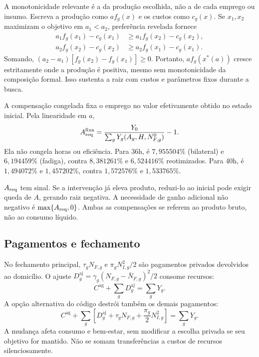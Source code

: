 A monotonicidade relevante é a da produção escolhida, não a de cada emprego ou insumo. Escreva a produção como $af_g(x)$ e os custos como $c_g(x)$. Se $x_1,x_2$ maximizam o objetivo em $a_1<a_2$, preferência revelada fornece
\begin{align*}
a_1f_g(x_1)-c_g(x_1)&\geq a_1f_g(x_2)-c_g(x_2),\\
a_2f_g(x_2)-c_g(x_2)&\geq a_2f_g(x_1)-c_g(x_1).
\end{align*}
Somando, $(a_2-a_1)[f_g(x_2)-f_g(x_1)]\geq0$. Portanto, $af_g(x^*(a))$ cresce estritamente onde a produção é positiva, mesmo sem monotonicidade da composição formal. Isso sustenta a raiz com custos e parâmetros fixos durante a busca.

A compensação congelada fixa o emprego no valor efetivamente obtido no estado inicial. Pela linearidade em $a$,
\begin{equation}\label{eq:app_areq_frozen}
A_{\mathrm{req}}^{\mathrm{fixa}}=\frac{Y_0}{\sum_gY_g(A_g,H,N_{F,g}^0)}-1.
\end{equation}
\begingroup{}
Ela não congela horas ou eficiência. Para 36h, é $7{,}955504\%$ (bilateral) e $6{,}194459\%$ (fadiga), contra $8{,}381261\%$ e $6{,}524416\%$ reotimizados. Para 40h, é $1{,}494072\%$ e $1{,}457202\%$, contra $1{,}572576\%$ e $1{,}533765\%$.
\par\endgroup

$A_{\mathrm{req}}$ tem sinal. Se a intervenção já eleva produto, reduzi-lo ao inicial pode exigir queda de $A$, gerando raiz negativa. A necessidade de ganho adicional não negativo é $\max\{A_{\mathrm{req}},0\}$. Ambas as compensações se referem ao produto bruto, não ao consumo líquido.

\subsection{Pagamentos e fechamento}\label{app:pe_omits}
No fechamento principal, $\tau_gN_{F,g}$ e $\pi_gN_{I,g}^2/2$ são pagamentos privados devolvidos ao domicílio. O ajuste $D_g^{\mathrm{aj}}=\gamma_g(N_{F,g}-\bar N_{F,g})^2/2$ consome recursos:
\begin{equation}\label{eq:app_resources}
C^{\mathrm{ag}}+\sum_gD_g^{\mathrm{aj}}=\sum_gY_g.
\end{equation}
A opção alternativa do código destrói também os demais pagamentos:
\begin{equation}\label{eq:app_resources_alternative}
C^{\mathrm{ag}}+\sum_g\left[D_g^{\mathrm{aj}}+\tau_gN_{F,g}+\frac{\pi_g}{2}N_{I,g}^2\right]=\sum_gY_g.
\end{equation}
A mudança afeta consumo e bem-estar, sem modificar a escolha privada se seu objetivo for mantido. Não se somam transferências a custos de recursos silenciosamente.


